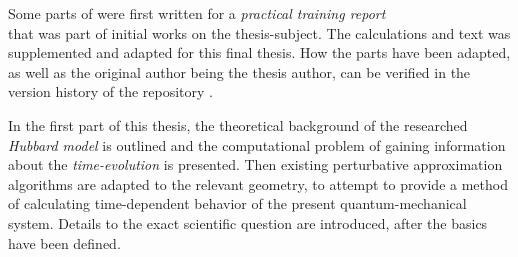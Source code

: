 Some parts of  were first written for a \emph{practical training report}\\  that was part of initial works on the thesis-subject.
The calculations and text was supplemented and adapted for this final thesis. 
How the parts have been adapted, as well as the original author being the thesis author, can be verified in the version history of the repository \cite{selfDocument}.

In the first part of this thesis, the theoretical background of the researched \emph{Hubbard model} is outlined and the computational problem of gaining information about the \emph{time-evolution} is presented.
Then existing perturbative approximation algorithms are adapted to the relevant geometry, to attempt to provide a method of calculating time-dependent behavior of the present quantum-mechanical system.
Details to the exact scientific question are introduced, after the basics have been defined.
